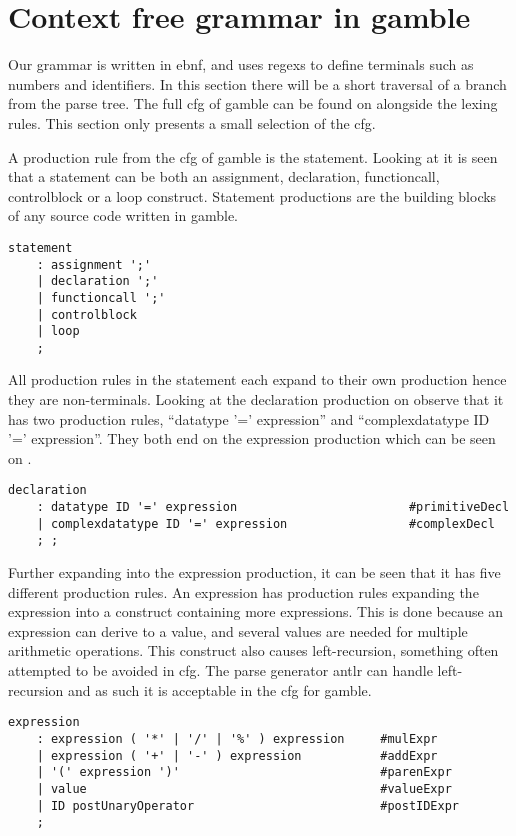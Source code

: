 \section{Context free grammar in gamble}
Our grammar is written in \acrfull{ebnf}, and uses \acrfull{regex}s to define terminals such as numbers and identifiers.
In this section there will be a short traversal of a branch from the parse tree.
The full \acrshort{cfg} of \gls{gamble} can be found on  alongside the lexing rules.
This section only presents a small selection of the \acrshort{cfg}.

A production rule from the \acrshort{cfg} of \gls{gamble} is the statement. 
Looking at  it is seen that a statement can be both an assignment, declaration, functioncall, controlblock or a loop construct. 
Statement productions are the building blocks of any source code written in \gls{gamble}.

\begin{lstlisting}[caption={\acrshort{cfg} Statement},frame=tlrb,label={lst:statements},numbers=none]
statement
    : assignment ';'
    | declaration ';'
    | functioncall ';'
    | controlblock
    | loop
    ;
\end{lstlisting}

All production rules in the statement each expand to their own production hence they are non-terminals.
Looking at the declaration production on  observe that it has two production rules, ``datatype '=' expression'' and ``complexdatatype ID '=' expression''. 
They both end on the expression production which can be seen on .

\begin{lstlisting}[caption={\acrshort{cfg} Declaration},frame=tlrb,label={lst:declaration},numbers=none]
declaration
    : datatype ID '=' expression                        #primitiveDecl
    | complexdatatype ID '=' expression                 #complexDecl
    ; ;
\end{lstlisting}

Further expanding into the expression production, it can be seen that it has five different production rules.
An expression has production rules expanding the expression into a construct containing more expressions.
This is done because an expression can derive to a value, and several values are needed for multiple arithmetic operations.
This construct also causes left-recursion, something often attempted to be avoided in \acrshort{cfg}.
The parse generator \acrshort{antlr} can handle left-recursion and as such it is acceptable in the \acrshort{cfg} for \gls{gamble}.
\begin{lstlisting}[caption={\acrshort{cfg} Expression},frame=tlrb,label={lst:expression},numbers=none]
expression
    : expression ( '*' | '/' | '%' ) expression     #mulExpr
    | expression ( '+' | '-' ) expression           #addExpr
    | '(' expression ')'                            #parenExpr
    | value                                         #valueExpr
    | ID postUnaryOperator                          #postIDExpr
    ;
\end{lstlisting}
  

